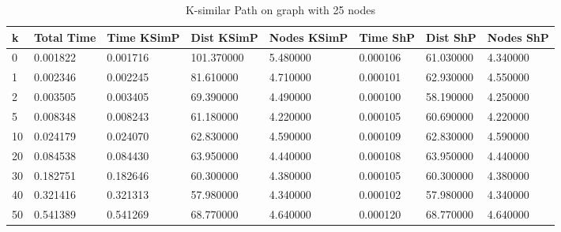 \documentclass[]{article}
\numberwithin{equation}{section}
\begin{document}
\begin{appendices}
\begin{table}[H]
	\centering
	\small
	\setlength\tabcolsep{2pt}
	\begin{tabular}{|l|l|l|l|l|l|l|l|}
		\hline
		k  & Total Time & Time KSimP & Dist KSimP & Nodes KSimP & Time ShP & Dist ShP  & Nodes ShP \\ \hline
		0  & 0.001822   & 0.001716   & 101.370000 & 5.480000    & 0.000106 & 61.030000 & 4.340000  \\ \hline
		1  & 0.002346   & 0.002245   & 81.610000  & 4.710000    & 0.000101 & 62.930000 & 4.550000  \\ \hline
		2  & 0.003505   & 0.003405   & 69.390000  & 4.490000    & 0.000100 & 58.190000 & 4.250000  \\ \hline
		5  & 0.008348   & 0.008243   & 61.180000  & 4.220000    & 0.000105 & 60.690000 & 4.220000  \\ \hline
		10 & 0.024179   & 0.024070   & 62.830000  & 4.590000    & 0.000109 & 62.830000 & 4.590000  \\ \hline
		20 & 0.084538   & 0.084430   & 63.950000  & 4.440000    & 0.000108 & 63.950000 & 4.440000  \\ \hline
		30 & 0.182751   & 0.182646   & 60.300000  & 4.380000    & 0.000105 & 60.300000 & 4.380000  \\ \hline
		40 & 0.321416   & 0.321313   & 57.980000  & 4.340000    & 0.000102 & 57.980000 & 4.340000  \\ \hline
		50 & 0.541389   & 0.541269   & 68.770000  & 4.640000    & 0.000120 & 68.770000 & 4.640000  \\ \hline
	\end{tabular}
	\caption{K-similar Path on graph with 25 nodes}
\end{table}


\end{appendices}
\end{document}
